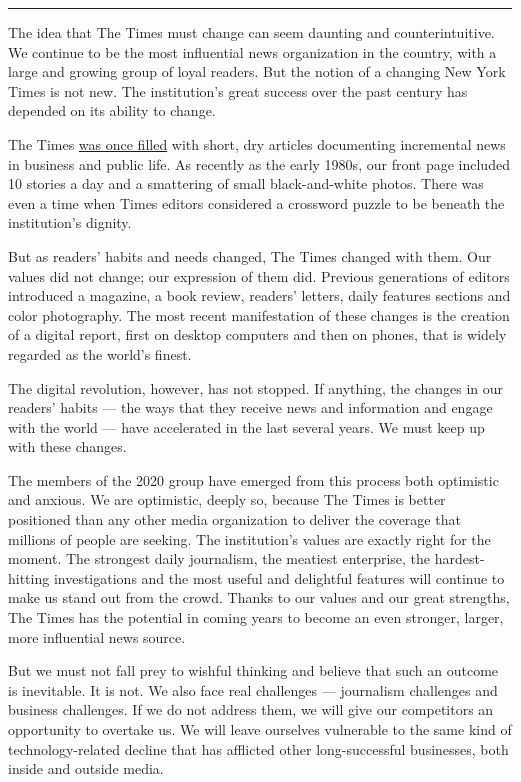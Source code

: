 \begin{center}\rule{0.5\linewidth}{\linethickness}\end{center}

The idea that The Times must change can seem daunting and
counterintuitive. We continue to be the most influential news
organization in the country, with a large and growing group of loyal
readers. But the notion of a changing New York Times is not new. The
institution's great success over the past century has depended on its
ability to change.

The Times
\href{https://timesmachine.nytimes.com/timesmachine/1917/01/17/issue.html}{was
once filled} with short, dry articles documenting incremental news in
business and public life. As recently as the early 1980s, our front page
included 10 stories a day and a smattering of small black-and-white
photos. There was even a time when Times editors considered a crossword
puzzle to be beneath the institution's dignity.

But as readers' habits and needs changed, The Times changed with them.
Our values did not change; our expression of them did. Previous
generations of editors introduced a magazine, a book review, readers'
letters, daily features sections and color photography. The most recent
manifestation of these changes is the creation of a digital report,
first on desktop computers and then on phones, that is widely regarded
as the world's finest.

The digital revolution, however, has not stopped. If anything, the
changes in our readers' habits --- the ways that they receive news and
information and engage with the world --- have accelerated in the last
several years. We must keep up with these changes.

The members of the 2020 group have emerged from this process both
optimistic and anxious. We are optimistic, deeply so, because The Times
is better positioned than any other media organization to deliver the
coverage that millions of people are seeking. The institution's values
are exactly right for the moment. The strongest daily journalism, the
meatiest enterprise, the hardest-hitting investigations and the most
useful and delightful features will continue to make us stand out from
the crowd. Thanks to our values and our great strengths, The Times has
the potential in coming years to become an even stronger, larger, more
influential news source.

But we must not fall prey to wishful thinking and believe that such an
outcome is inevitable. It is not. We also face real challenges ---
journalism challenges and business challenges. If we do not address
them, we will give our competitors an opportunity to overtake us. We
will leave ourselves vulnerable to the same kind of technology-related
decline that has afflicted other long-successful businesses, both inside
and outside media.


